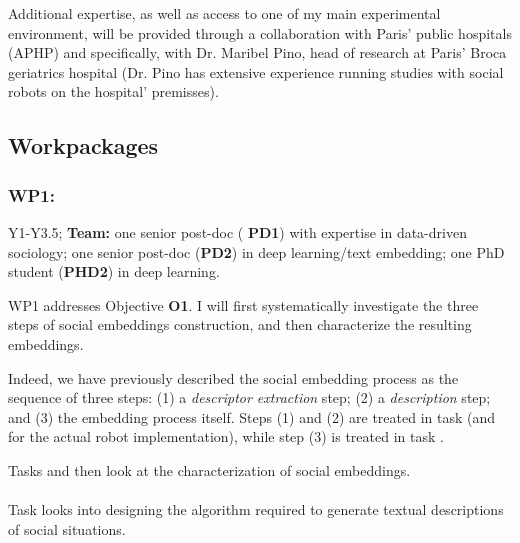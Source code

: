 Additional expertise, as well as access to one of my main experimental
environment, will be provided through a collaboration with Paris' public
hospitals (APHP) and specifically, with Dr. Maribel Pino, head of research at
Paris' Broca geriatrics hospital (Dr. Pino has extensive experience running
studies with social robots on the hospital' premisses).


\subsection{Workpackages}

\subsubsection{WP1: \textbf{\WPA}}

\begin{framed}
 Y1-Y3.5; {\bf Team:} one senior post-doc ({\bf
PD1}) with expertise in data-driven sociology; one senior post-doc ({\bf PD2})
in deep learning/text embedding; one PhD student ({\bf PHD2}) in deep learning.
\end{framed}


WP1 addresses Objective \textbf{O1}. I will first systematically investigate
the three steps of social embeddings construction, and then characterize the
resulting embeddings.

Indeed, we have previously described the social embedding process as the
sequence of three steps: (1) a \emph{descriptor extraction} step; (2) a
\emph{description} step; and (3) the embedding process itself.  Steps (1) and
(2) are treated in task \tAA (and \tCA for the actual robot implementation),
while step (3) is treated in task \tAB.

Tasks \tAC and \tAD then look at the characterization of social embeddings.

\paragraph{\TAA}

Task \tAA looks into designing the algorithm required to generate textual
descriptions of social situations.

